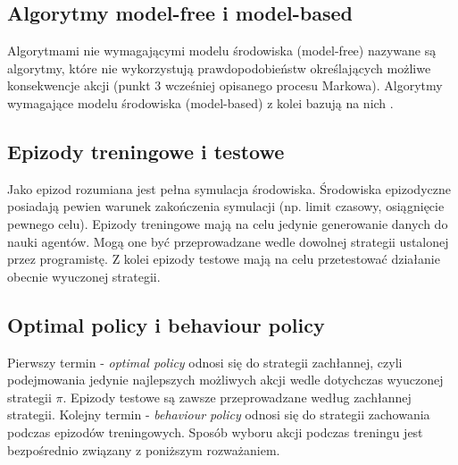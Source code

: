 \documentclass[12pt]{book}
\theoremstyle{plain}
\begin{document}
\subsection*{Algorytmy model-free i model-based}
Algorytmami nie wymagającymi modelu środowiska (model-free) nazywane są algorytmy, które nie wykorzystują prawdopodobieństw określających możliwe konsekwencje akcji (punkt 3 wcześniej opisanego procesu Markowa). Algorytmy wymagające modelu środowiska (model-based) z kolei bazują na nich \cite{reinforcementBook}.
\subsection*{Epizody treningowe i testowe}
Jako epizod rozumiana jest pełna symulacja środowiska. Środowiska epizodyczne posiadają pewien warunek zakończenia symulacji (np. limit czasowy, osiągnięcie pewnego celu). Epizody treningowe mają na celu jedynie generowanie danych do nauki agentów. Mogą one być przeprowadzane wedle dowolnej strategii ustalonej przez programistę. Z kolei epizody testowe mają na celu przetestować działanie obecnie wyuczonej strategii.
\subsection*{Optimal policy i behaviour policy}
Pierwszy termin - \emph{optimal policy} odnosi się do strategii zachłannej, czyli podejmowania jedynie najlepszych możliwych akcji wedle dotychczas wyuczonej strategii $\pi$. Epizody testowe są zawsze przeprowadzane według zachłannej strategii. Kolejny termin - \emph{behaviour policy} odnosi się do strategii zachowania podczas epizodów treningowych. Sposób wyboru akcji podczas treningu jest bezpośrednio związany z poniższym rozważaniem.
\end{document}
